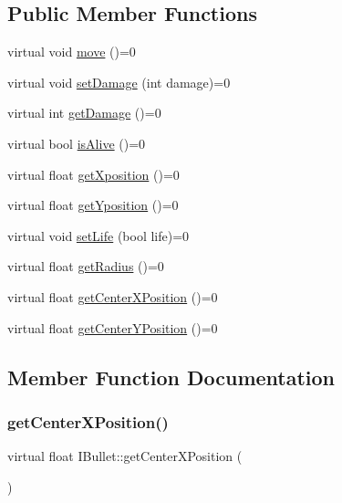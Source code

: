 \subsection*{Public Member Functions}
\begin{DoxyCompactItemize}
\item 
virtual void \hyperlink{class_i_bullet_a0884074f0bc793fb5a52ac33842622fd}{move} ()=0
\item 
virtual void \hyperlink{class_i_bullet_a072298555accb47f11b84f4c781ae876}{set\+Damage} (int damage)=0
\item 
virtual int \hyperlink{class_i_bullet_ab6643a4ad3888ee4ebfbc3d445c4b73d}{get\+Damage} ()=0
\item 
virtual bool \hyperlink{class_i_bullet_ac1252496738126ec94a97512011b9112}{is\+Alive} ()=0
\item 
virtual float \hyperlink{class_i_bullet_a20babdd6c657ddda175e84a56564dcfa}{get\+Xposition} ()=0
\item 
virtual float \hyperlink{class_i_bullet_a36594de9a0c0ddd7083bca10ef5d8332}{get\+Yposition} ()=0
\item 
virtual void \hyperlink{class_i_bullet_abf99befdaa121e7c9ca2acc2ed75b513}{set\+Life} (bool life)=0
\item 
virtual float \hyperlink{class_i_bullet_a327968e71126cdea5998076d8919354f}{get\+Radius} ()=0
\item 
virtual float \hyperlink{class_i_bullet_a43a43e2df81e05a03be42d9025e6dd2a}{get\+Center\+X\+Position} ()=0
\item 
virtual float \hyperlink{class_i_bullet_a8245ed2bc72beed1d69547ce5f87a021}{get\+Center\+Y\+Position} ()=0
\end{DoxyCompactItemize}


\subsection{Member Function Documentation}
\mbox{\label{class_i_bullet_a43a43e2df81e05a03be42d9025e6dd2a}} 
\subsubsection{\texorpdfstring{get\+Center\+X\+Position()}{getCenterXPosition()}}
{\footnotesize\ttfamily virtual float I\+Bullet\+::get\+Center\+X\+Position (\begin{DoxyParamCaption}{ }\end{DoxyParamCaption})\hspace{0.3cm}{\ttfamily [pure virtual]}}



